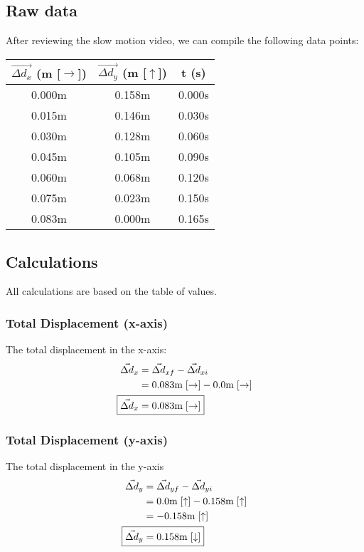 \documentclass[a4paper,12pt]{article}
\begin{document}
	\subsection{Raw data}
	After reviewing the slow motion video, we can compile the following data points:
	\begin{center}
		\begin{tabular}{ |c|c|c| } 
			\hline
			$\vec{\Delta d_x}$ (m [$\rightarrow$]) & $\vec{\Delta d_y}$ (m [$\uparrow$]) & t (s)\\ 
			\hline\hline
			0.000m & 0.158m & 0.000s\\
			\hline 
			0.015m & 0.146m & 0.030s\\ 
			\hline
			0.030m & 0.128m & 0.060s\\
			\hline
			0.045m & 0.105m & 0.090s \\
			\hline
			0.060m & 0.068m & 0.120s\\
			\hline
			0.075m & 0.023m & 0.150s \\
			\hline
			0.083m & 0.000m & 0.165s\\
			\hline
		\end{tabular} 
	\end{center}
	\bigskip
	
	\newpage
	
	\subsection{Calculations}
	All calculations are based on the table of values. 
	\subsubsection{Total Displacement (x-axis)}
	The total displacement in the x-axis:
	\begin{align*}
		\vec{\Delta d}_x&=\vec{\Delta d}_{xf}-\vec{\Delta d}_{xi}\\
		&=0.083 \text{m}\;[\rightarrow]-0.0 \text{m}\; [\rightarrow]\\
		\Aboxed{\vec{\Delta d}_x&=0.083\text{m}\; [\rightarrow]}
	\end{align*}
	\subsubsection{Total Displacement (y-axis)}
	The total displacement in the y-axis
	\begin{align*}
		\vec{\Delta d}_y&=\vec{\Delta d}_{yf}-\vec{\Delta d}_{yi}\\
		&=0.0 \text{m}\; [\uparrow]-0.158 \text{m}\; [\uparrow]\\
		&=-0.158\text{m}\; [\uparrow]\\
		\Aboxed{\vec{\Delta d}_y&=0.158\text{m}\; [\downarrow]}
	\end{align*}
\end{document}
